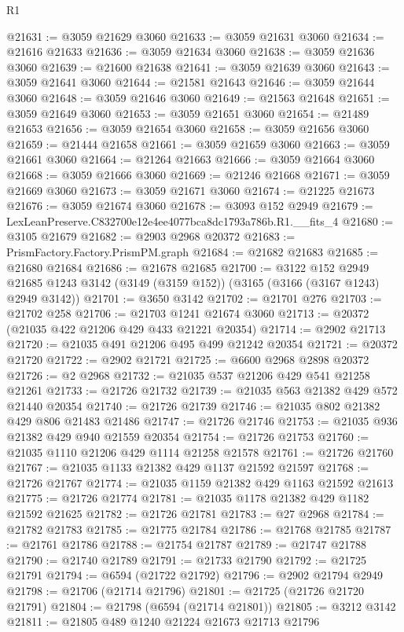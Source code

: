 \begin{lexlean}{R1}
\begin{coremodule}
@21631 := @3059 @21629 @3060
@21633 := @3059 @21631 @3060
@21634 := @21616 @21633
@21636 := @3059 @21634 @3060
@21638 := @3059 @21636 @3060
@21639 := @21600 @21638
@21641 := @3059 @21639 @3060
@21643 := @3059 @21641 @3060
@21644 := @21581 @21643
@21646 := @3059 @21644 @3060
@21648 := @3059 @21646 @3060
@21649 := @21563 @21648
@21651 := @3059 @21649 @3060
@21653 := @3059 @21651 @3060
@21654 := @21489 @21653
@21656 := @3059 @21654 @3060
@21658 := @3059 @21656 @3060
@21659 := @21444 @21658
@21661 := @3059 @21659 @3060
@21663 := @3059 @21661 @3060
@21664 := @21264 @21663
@21666 := @3059 @21664 @3060
@21668 := @3059 @21666 @3060
@21669 := @21246 @21668
@21671 := @3059 @21669 @3060
@21673 := @3059 @21671 @3060
@21674 := @21225 @21673
@21676 := @3059 @21674 @3060
@21678 := @3093 @152 @2949
@21679 := LexLeanPreserve.C832700e12e4ee4077bca8dc1793a786b.R1.__fits_4
@21680 := @3105 @21679
@21682 := @2903 @2968 @20372
@21683 := PrismFactory.Factory.PrismPM.graph
@21684 := @21682 @21683
@21685 := @21680 @21684
@21686 := @21678 @21685
@21700 := @3122
    @152
    @2949
    @21685
    @1243
    @3142
    (@3149 (@3159 @152))
    (@3165 (@3166 (@3167 @1243) @2949 @3142))
@21701 := @3650 @3142
@21702 := @21701 @276
@21703 := @21702 @258
@21706 := @21703 @1241 @21674 @3060
@21713 := @20372 (@21035 @422 @21206 @429 @433 @21221 @20354)
@21714 := @2902 @21713
@21720 := @21035 @491 @21206 @495 @499 @21242 @20354
@21721 := @20372 @21720
@21722 := @2902 @21721
@21725 := @6600 @2968 @2898 @20372
@21726 := @2 @2968
@21732 := @21035 @537 @21206 @429 @541 @21258 @21261
@21733 := @21726 @21732
@21739 := @21035 @563 @21382 @429 @572 @21440 @20354
@21740 := @21726 @21739
@21746 := @21035 @802 @21382 @429 @806 @21483 @21486
@21747 := @21726 @21746
@21753 := @21035 @936 @21382 @429 @940 @21559 @20354
@21754 := @21726 @21753
@21760 := @21035 @1110 @21206 @429 @1114 @21258 @21578
@21761 := @21726 @21760
@21767 := @21035 @1133 @21382 @429 @1137 @21592 @21597
@21768 := @21726 @21767
@21774 := @21035 @1159 @21382 @429 @1163 @21592 @21613
@21775 := @21726 @21774
@21781 := @21035 @1178 @21382 @429 @1182 @21592 @21625
@21782 := @21726 @21781
@21783 := @27 @2968
@21784 := @21782 @21783
@21785 := @21775 @21784
@21786 := @21768 @21785
@21787 := @21761 @21786
@21788 := @21754 @21787
@21789 := @21747 @21788
@21790 := @21740 @21789
@21791 := @21733 @21790
@21792 := @21725 @21791
@21794 := @6594 (@21722 @21792)
@21796 := @2902 @21794 @2949
@21798 := @21706 (@21714 @21796)
@21801 := @21725 (@21726 @21720 @21791)
@21804 := @21798 (@6594 (@21714 @21801))
@21805 := @3212 @3142
@21811 := @21805 @489 @1240 @21224 @21673 @21713 @21796

\end{coremodule}
\end{lexlean}
